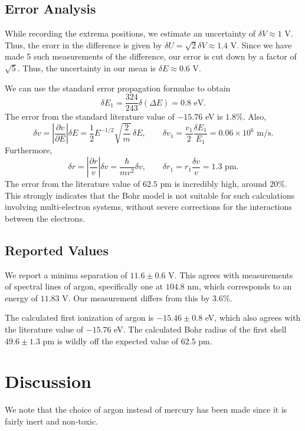 \documentclass[11pt]{article}
\begin{document}
        \subsection{Error Analysis}
        While recording the extrema positions, we estimate an uncertainty of $\delta V \approx 1$ V.
        Thus, the erorr in the difference is given by $\delta U = \sqrt{2}\delta V \approx 1.4$ V.
        Since we have made 5 such measurements of the difference, our error is cut down by a factor of $\sqrt{5}$.
        Thus, the uncertainty in our mean is $\delta E \approx 0.6$ V.
        
        We can use the standard error propagation formulae to obtain
        \[
                \delta E_1 = \frac{324}{243}\delta(\Delta E) = 0.8\text{ eV}.
        \]
        The error from the standard literature value of $-15.76$ eV is $1.8\%$.
        Also,
        \[
                \delta v = \left|\frac{\partial v}{\partial E}\right|\delta E = \frac{1}{2}E^{-1 /2}\sqrt{\frac{2}{m}}\,\delta E,\qquad
                \delta v_1 = \frac{v_1}{2}\frac{\delta E_1}{E_1} = 0.06\times 10^6 \text{ m/s}.
        \]
        Furthermore,
        \[
                \delta r = \left|\frac{\partial r}{v}\right|\delta v = \frac{\hbar}{mv^2}\delta v, \qquad
                \delta r_1 = r_1\frac{\delta v}{v} = 1.3\text{ pm}.
        \]
        The error from the literature value of $62.5$ pm is incredibly high, around $20\%$.
        This strongly indicates that the Bohr model is not suitable for such calculations involving multi-electron systems,
        without severe corrections for the interactions between the electrons.


        \subsection{Reported Values}
        We report a minima separation of $11.6 \pm 0.6$ V. This agrees with measurements of spectral lines of argon, specifically
        one at $104.8$ nm, which corresponds to an energy of $11.83$ V.
        Our measurement differs from this by $3.6\%$.

        The calculated first ionization of argon is $-15.46 \pm 0.8$ eV, which also agrees with the literature value of $-15.76$ eV.
        The calculated Bohr radius of the first shell $49.6 \pm 1.3$ pm is wildly off the expected value of $62.5$ pm.

        \section{Discussion}
        We note that the choice of argon instead of mercury has been made since it is fairly inert and non-toxic.
\end{document}
